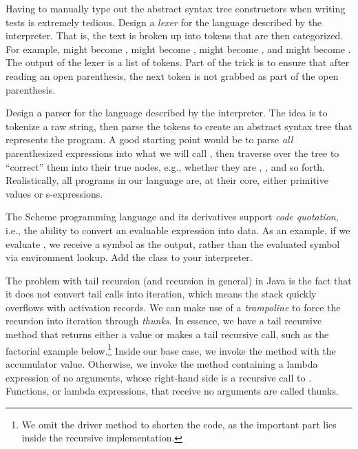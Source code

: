 Having to manually type out the abstract syntax tree constructors when writing tests is extremely tedious. Design a \emph{lexer} for the language described by the interpreter. That is, the text is broken up into tokens that are then categorized. For example,  might become ,  might become ,  might become , and  might become . The output of the lexer is a list of tokens. Part of the trick is to ensure that after reading an open parenthesis, the next token is not grabbed as part of the open parenthesis.

Design a parser for the language described by the interpreter. The idea is to tokenize a raw string, then parse the tokens to create an abstract syntax tree that represents the program. A good starting point would be to parse \emph{all} parenthesized expressions into what we will call , then traverse over the tree to ``correct'' them into their true nodes, e.g., whether they are , , and so forth. Realistically, all programs in our language are, at their core, either primitive values or s-expressions.

The Scheme programming language and its derivatives support \emph{code quotation}, i.e., the ability to convert an evaluable expression into data. As an example, if we evaluate , we receive a symbol as the output, rather than the evaluated symbol via environment lookup. Add the  class to your interpreter.


The problem with tail recursion (and recursion in general) in Java is the fact that it does not convert tail calls into iteration, which means the stack quickly overflows with activation records. We can make use of a \emph{trampoline} to force the recursion into iteration through \emph{thunks}. In essence, we have a tail recursive method that returns either a value or makes a tail recursive call, such as the factorial example below.\footnote{We omit the driver method to shorten the code, as the important part lies inside the recursive implementation.} Inside our base case, we invoke the  method with the accumulator value. Otherwise, we invoke the  method containing a lambda expression of no arguments, whose right-hand side is a recursive call to . Functions, or lambda expressions, that receive no arguments are called thunks.


